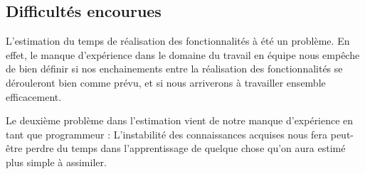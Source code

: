 \subsection{Difficultés encourues} 
L'estimation du temps de réalisation des fonctionnalités à été un problème. 
En effet, le manque d'expérience dans le domaine du travail en équipe nous empêche de bien définir si nos enchainements entre la réalisation des fonctionnalités se dérouleront bien comme prévu, et si nous arriverons à travailler ensemble efficacement. 

Le deuxième problème dans l'estimation vient de notre manque d'expérience en tant que programmeur :
L'instabilité des connaissances acquises nous fera peut-être perdre du temps dans l'apprentissage de quelque chose qu'on aura estimé plus simple à assimiler. 
